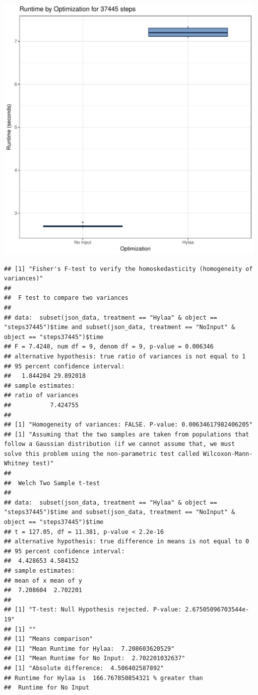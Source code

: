\documentclass{article}\usepackage[]{graphicx}\usepackage[]{color}
\makeatletter
\def\maxwidth{ %
  \ifdim\Gin@nat@width>\linewidth
    \linewidth
  \else
    \Gin@nat@width
  \fi
}
\newenvironment{kframe}{%
 \def\at@end@of@kframe{}%
 \ifinner\ifhmode%
  \def\at@end@of@kframe{\end{minipage}}%
  \begin{minipage}{\columnwidth}%
 \fi\fi%
 \def\FrameCommand##1{\hskip\@totalleftmargin \hskip-\fboxsep
 \colorbox{shadecolor}{##1}\hskip-\fboxsep
     \hskip-\linewidth \hskip-\@totalleftmargin \hskip\columnwidth}%
 \MakeFramed {\advance\hsize-\width
   \@totalleftmargin\z@ \linewidth\hsize
   \@setminipage}}%
 {\par\unskip\endMakeFramed%
 \at@end@of@kframe}
\newenvironment{knitrout}{}{} %
\makeatother
\begin{document}
\begin{knitrout}
\color{fgcolor}
\includegraphics[width=\maxwidth]{figure/RH4_steps37445-1} 
\begin{kframe}\begin{verbatim}
## [1] "Fisher's F-test to verify the homoskedasticity (homogeneity of variances)"
## 
## 	F test to compare two variances
## 
## data:  subset(json_data, treatment == "Hylaa" & object == "steps37445")$time and subset(json_data, treatment == "NoInput" & object == "steps37445")$time
## F = 7.4248, num df = 9, denom df = 9, p-value = 0.006346
## alternative hypothesis: true ratio of variances is not equal to 1
## 95 percent confidence interval:
##   1.844204 29.892018
## sample estimates:
## ratio of variances 
##           7.424755 
## 
## [1] "Homogeneity of variances: FALSE. P-value: 0.00634617982406205"
## [1] "Assuming that the two samples are taken from populations that follow a Gaussian distribution (if we cannot assume that, we must solve this problem using the non-parametric test called Wilcoxon-Mann-Whitney test)"
## 
## 	Welch Two Sample t-test
## 
## data:  subset(json_data, treatment == "Hylaa" & object == "steps37445")$time and subset(json_data, treatment == "NoInput" & object == "steps37445")$time
## t = 127.05, df = 11.381, p-value < 2.2e-16
## alternative hypothesis: true difference in means is not equal to 0
## 95 percent confidence interval:
##  4.428653 4.584152
## sample estimates:
## mean of x mean of y 
##  7.208604  2.702201 
## 
## [1] "T-test: Null Hypothesis rejected. P-value: 2.67505096703544e-19"
## [1] ""
## [1] "Means comparison"
## [1] "Mean Runtime for Hylaa:  7.208603620529"
## [1] "Mean Runtime for No Input:  2.702201032637"
## [1] "Absolute difference:  4.506402587892"
## Runtime for Hylaa is  166.767850854321 % greater than 
##  Runtime for No Input
\end{verbatim}
\end{kframe}
\end{knitrout}
\end{document}
